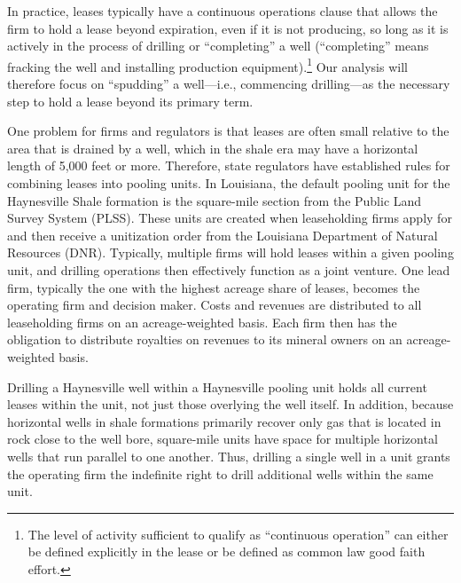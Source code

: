 \documentclass[12pt]{article}
\begin{document}
In practice, leases typically have a continuous operations clause that allows the firm to hold a lease beyond expiration, even if it is not producing, so long as it is actively in the process of drilling or ``completing'' a well (``completing'' means fracking the well and installing production equipment).\footnote{The level of activity sufficient to qualify as ``continuous operation'' can either be defined explicitly in the lease or be defined as common law good faith effort.} Our analysis will therefore focus on ``spudding'' a well---i.e., commencing drilling---as the necessary step to hold a lease beyond its primary term.

One problem for firms and regulators is that leases are often small relative to the area that is drained by a well, which in the shale era may have a horizontal length of 5,000 feet or more. Therefore, state regulators have established rules for combining leases into pooling units. In Louisiana, the default pooling unit for the Haynesville Shale formation is the square-mile section from the Public Land Survey System (PLSS). These units are created when leaseholding firms apply for and then receive a unitization order from the Louisiana Department of Natural Resources (DNR). Typically, multiple firms will hold leases within a given pooling unit, and drilling operations then effectively function as a joint venture. One lead firm, typically the one with the highest acreage share of leases, becomes the operating firm and decision maker. Costs and revenues are distributed to all leaseholding firms on an acreage-weighted basis. Each firm then has the obligation to distribute royalties on revenues to its mineral owners on an acreage-weighted basis.

Drilling a Haynesville well within a Haynesville pooling unit holds all current leases within the unit, not just those overlying the well itself. In addition, because horizontal wells in shale formations primarily recover only gas that is located in rock close to the well bore, square-mile units have space for multiple horizontal wells that run parallel to one another. Thus, drilling a single well in a unit grants the operating firm the indefinite right to drill additional wells within the same unit.
\end{document}
